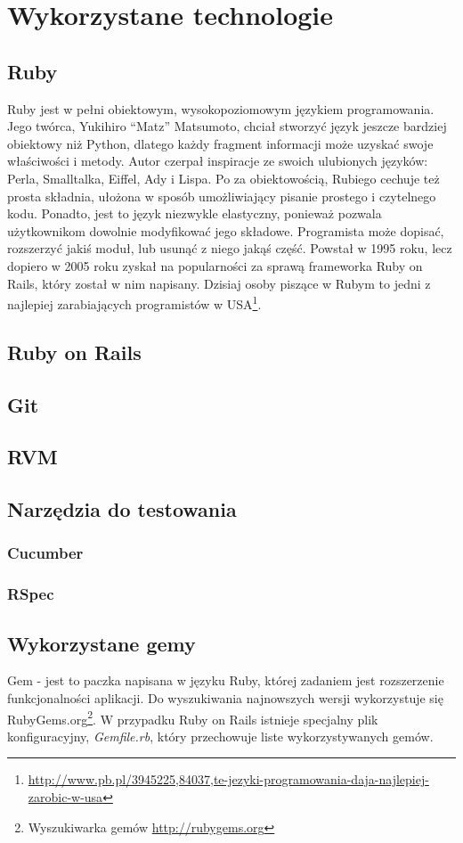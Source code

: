 \section{Wykorzystane technologie}
  \subsection{Ruby}
  Ruby jest w pełni obiektowym, wysokopoziomowym językiem programowania. Jego twórca, Yukihiro “Matz” Matsumoto, chciał stworzyć język jeszcze bardziej obiektowy niż Python, dlatego każdy fragment informacji może uzyskać swoje właściwości i metody. Autor czerpał inspiracje ze swoich ulubionych języków: Perla, Smalltalka, Eiffel, Ady i Lispa. Po za obiektowością, Rubiego cechuje też prosta składnia, ułożona w sposób umożliwiający pisanie prostego i czytelnego kodu. Ponadto, jest to język niezwykle elastyczny, ponieważ pozwala użytkownikom dowolnie modyfikować jego składowe. Programista może dopisać, rozszerzyć jakiś moduł, lub usunąć z niego jakąś część. Powstał w 1995 roku, lecz dopiero w 2005 roku zyskał na popularności za sprawą frameworka Ruby on Rails, który został w nim napisany. Dzisiaj osoby piszące w Rubym to jedni z najlepiej zarabiających programistów w USA\footnote{\url{http://www.pb.pl/3945225,84037,te-jezyki-programowania-daja-najlepiej-zarobic-w-usa}}.
  \subsection{Ruby on Rails}
  \subsection{Git}
  \subsection{RVM}
  \subsection{Narzędzia do testowania}
    \subsubsection{Cucumber}
    \subsubsection{RSpec}
  \subsection{Wykorzystane gemy}
    Gem - jest to paczka napisana w języku Ruby, której zadaniem jest rozszerzenie funkcjonalności aplikacji. Do wyszukiwania najnowszych wersji wykorzystuje się RubyGems.org\footnote{Wyszukiwarka gemów \url{http://rubygems.org}}. W przypadku Ruby on Rails istnieje specjalny plik konfiguracyjny, \emph{Gemfile.rb}, który przechowuje liste wykorzystywanych gemów.

